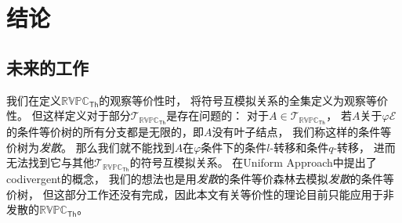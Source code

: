 \chapter{结论}


\section{未来的工作}
我们在定义$\mathbb{RVPC}_{\mathsf{Th}}$的观察等价性时，
将符号互模拟关系的全集定义为观察等价性。
但这样定义对于部分$\mathcal{T}_{\mathbb{RVPC}_{\mathsf{Th}}}$是存在问题的：
对于$A\in \mathcal{T}_{\mathbb{RVPC}_{\mathsf{Th}}}$，
若$A$关于$\varphi\mathcal{E}$的条件等价树的所有分支都是无限的，即$A$没有叶子结点，
我们称这样的条件等价树为\textit{发散}。
那么我们就不能找到$A$在$\varphi$条件下的条件$l$-转移和条件$q$-转移，
进而无法找到它与其他$\mathcal{T}_{\mathbb{RVPC}_{\mathsf{Th}}}$的符号互模拟关系。
在Uniform Approach中提出了codivergent的概念，
我们的想法也是用\textit{发散}的条件等价森林去模拟\textit{发散}的条件等价树，
但这部分工作还没有完成，因此本文有关等价性的理论目前只能应用于非发散的$\mathbb{RVPC}_{\mathsf{Th}}$。
